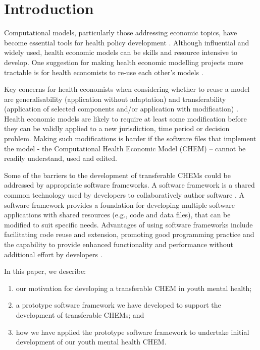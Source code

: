 \documentclass[sn-vancouver,Numbered,pdflatex]{sn-jnl}
\theoremstyle{remark}
\theoremstyle{definition}
\begin{document}
\hypertarget{introduction}{%
\section{Introduction}\label{introduction}}

Computational models, particularly those addressing economic topics, have become essential tools for health policy development \citep{dakin2015influence, Erdemir2020}. Although influential and widely used, health economic models can be skills and resource intensive to develop. One suggestion for making health economic modelling projects more tractable is for health economists to re-use each other's models \citep{Arnold2010}.

Key concerns for health economists when considering whether to reuse a model are generalisability (application without adaptation) and transferability (application of selected components and/or application with modification) \citep{RN39}. Health economic models are likely to require at least some modification before they can be validly applied to a new jurisdiction, time period or decision problem. Making such modifications is harder if the software files that implement the model - the Computational Health Economic Model (CHEM) -- cannot be readily understand, used and edited.

Some of the barriers to the development of transferable CHEMs could be addressed by appropriate software frameworks. A software framework is a shared common technology used by developers to collaboratively author software \citep{myllarniemi2018development}. A software framework provides a foundation for developing multiple software applications with shared resources (e.g., code and data files), that can be modified to suit specific needs. Advantages of using software frameworks include facilitating code reuse and extension, promoting good programming practice and the capability to provide enhanced functionality and performance without additional effort by developers \citep{edwin2014software}.

In this paper, we describe:

\begin{enumerate}
\def\labelenumi{(\roman{enumi})}
\item
  our motivation for developing a transferable CHEM in youth mental health;
\item
  a prototype software framework we have developed to support the development of transferable CHEMs; and
\item
  how we have applied the prototype software framework to undertake initial development of our youth mental health CHEM.
\end{enumerate}
\end{document}
